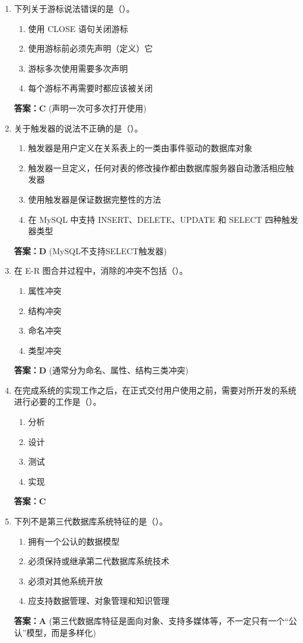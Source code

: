 \documentclass[12pt, a4paper]{article}
\begin{document}
\begin{enumerate}[label=\arabic*.]
    \item 下列关于游标说法错误的是（\quad）。
    \begin{enumerate}
        \item 使用 CLOSE 语句关闭游标
        \item 使用游标前必须先声明（定义）它
        \item 游标多次使用需要多次声明
        \item 每个游标不再需要时都应该被关闭
    \end{enumerate}
    \textbf{答案：C} (声明一次可多次打开使用)

    \item 关于触发器的说法不正确的是（\quad）。
    \begin{enumerate}
        \item 触发器是用户定义在关系表上的一类由事件驱动的数据库对象
        \item 触发器一旦定义，任何对表的修改操作都由数据库服务器自动激活相应触发器
        \item 使用触发器是保证数据完整性的方法
        \item 在 MySQL 中支持 INSERT、DELETE、UPDATE 和 SELECT 四种触发器类型
    \end{enumerate}
    \textbf{答案：D} (MySQL不支持SELECT触发器)

    \item 在 E-R 图合并过程中，消除的冲突不包括（\quad）。
    \begin{enumerate}
        \item 属性冲突
        \item 结构冲突
        \item 命名冲突
        \item 类型冲突
    \end{enumerate}
    \textbf{答案：D} (通常分为命名、属性、结构三类冲突)

    \item 在完成系统的实现工作之后，在正式交付用户使用之前，需要对所开发的系统进行必要的工作是（\quad）。
    \begin{enumerate}
        \item 分析
        \item 设计
        \item 测试
        \item 实现
    \end{enumerate}
    \textbf{答案：C}

    \item 下列不是第三代数据库系统特征的是（\quad）。
    \begin{enumerate}
        \item 拥有一个公认的数据模型
        \item 必须保持或继承第二代数据库系统技术
        \item 必须对其他系统开放
        \item 应支持数据管理、对象管理和知识管理
    \end{enumerate}
    \textbf{答案：A} (第三代数据库特征是面向对象、支持多媒体等，不一定只有一个“公认”模型，而是多样化)


\end{enumerate}
\end{document}
